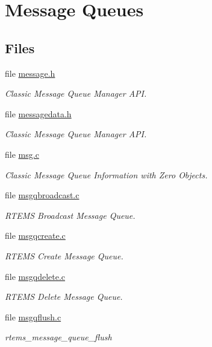 \hypertarget{group__ClassicMessageQueue}{}\section{Message Queues}
\label{group__ClassicMessageQueue}
\subsection*{Files}
\begin{DoxyCompactItemize}
\item 
file \mbox{\hyperlink{message_8h}{message.\+h}}
\begin{DoxyCompactList}\small\item\em Classic Message Queue Manager A\+PI. \end{DoxyCompactList}\item 
file \mbox{\hyperlink{messagedata_8h}{messagedata.\+h}}
\begin{DoxyCompactList}\small\item\em Classic Message Queue Manager A\+PI. \end{DoxyCompactList}\item 
file \mbox{\hyperlink{msg_8c}{msg.\+c}}
\begin{DoxyCompactList}\small\item\em Classic Message Queue Information with Zero Objects. \end{DoxyCompactList}\item 
file \mbox{\hyperlink{msgqbroadcast_8c}{msgqbroadcast.\+c}}
\begin{DoxyCompactList}\small\item\em R\+T\+E\+MS Broadcast Message Queue. \end{DoxyCompactList}\item 
file \mbox{\hyperlink{msgqcreate_8c}{msgqcreate.\+c}}
\begin{DoxyCompactList}\small\item\em R\+T\+E\+MS Create Message Queue. \end{DoxyCompactList}\item 
file \mbox{\hyperlink{msgqdelete_8c}{msgqdelete.\+c}}
\begin{DoxyCompactList}\small\item\em R\+T\+E\+MS Delete Message Queue. \end{DoxyCompactList}\item 
file \mbox{\hyperlink{msgqflush_8c}{msgqflush.\+c}}
\begin{DoxyCompactList}\small\item\em rtems\+\_\+message\+\_\+queue\+\_\+flush \end{DoxyCompactList}\item 

\end{DoxyCompactItemize}
